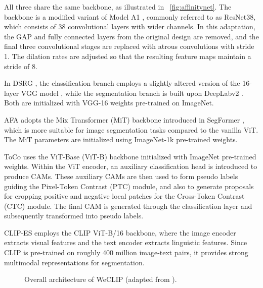 All three share the same backbone, as illustrated in ~\autoref{fig:affinitynet}. The backbone is a modified variant of Model A1 \cite{RevisitingResNET}, commonly referred to as ResNet38, which consists of 38 convolutional layers with wider channels. In this adaptation, the GAP and fully connected layers from the original design are removed, and the final three convolutional stages are replaced with atrous convolutions with stride 1. The dilation rates are adjusted so that the resulting feature maps maintain a stride of 8.

In DSRG \cite{wsss_dsrg_deep_seeded_region_growing}, the classification branch employs a slightly altered version of the 16-layer VGG model \cite{VGG16}, while the segmentation branch is built upon DeepLabv2 \cite{fsss_deeplabv2}. Both are initialized with VGG-16 weights pre-trained on ImageNet.

AFA \cite{wsss_afa_affinity_from_attention} adopts the Mix Transformer (MiT) backbone introduced in SegFormer \cite{fsss_segformer}, which is more suitable for image segmentation tasks compared to the vanilla ViT. The MiT parameters are initialized using ImageNet-1k pre-trained weights.

ToCo \cite{wsss_toco_token_contrast} uses the ViT-Base (ViT-B) backbone initialized with ImageNet pre-trained weights. Within the ViT encoder, an auxiliary classification head is introduced to produce CAMs. These auxiliary CAMs are then used to form pseudo labels guiding the Pixel-Token Contrast (PTC) module, and also to generate proposals for cropping positive and negative local patches for the Cross-Token Contrast (CTC) module. The final CAM is generated through the classification layer and subsequently transformed into pseudo labels.

CLIP-ES \cite{wsss_clip_es} employs the CLIP ViT-B/16 backbone, where the image encoder extracts visual features and the text encoder extracts linguistic features. Since CLIP is pre-trained on roughly 400 million image-text pairs, it provides strong multimodal representations for segmentation.

\begin{figure}[htbp]
    \centering
    \caption{Overall architecture of WeCLIP (adapted from \cite{wsss_frozen_clip}).}
    \label{fig:frozenclip}
\end{figure}

